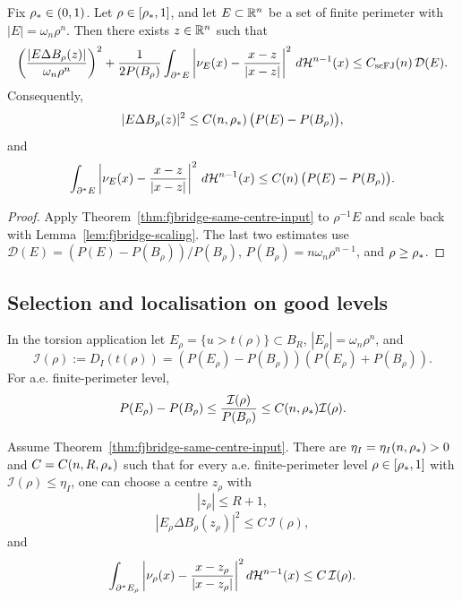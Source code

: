 \begin{corollary}
\label{cor:fjbridge-scaled}
Fix \(\rho_*\in(0,1)\).  Let \(\rho\in[\rho_*,1]\), and let
\(E\subset\mathbb{R}^n\) be a set of finite perimeter with
\(|E|=\omega_n\rho^n\).  Then there exists \(z\in\mathbb{R}^n\) such that
\[
   \left(\frac{|E\Delta B_\rho(z)|}{\omega_n\rho^n}\right)^2
   +\frac{1}{2P(B_\rho)}
      \int_{\partial^*E}
      \left|\nu_E(x)-\frac{x-z}{|x-z|}\right|^2\,d\mathcal H^{n-1}(x)
   \le C_{\rm scFJ}(n)\,\mathcal D(E).
\]
Consequently,
\[
   |E\Delta B_\rho(z)|^2
      \le C(n,\rho_*)\,
         \bigl(P(E)-P(B_\rho)\bigr),
\]
and
\[
   \int_{\partial^*E}
      \left|\nu_E(x)-\frac{x-z}{|x-z|}\right|^2\,d\mathcal H^{n-1}(x)
      \le C(n)\,\bigl(P(E)-P(B_\rho)\bigr).
\]
\end{corollary}

\begin{proof}
Apply Theorem~\ref{thm:fjbridge-same-centre-input} to
\(\rho^{-1}E\) and scale back with Lemma~\ref{lem:fjbridge-scaling}.
The last two estimates use
\(\mathcal D(E)=(P(E)-P(B_\rho))/P(B_\rho)\),
\(P(B_\rho)=n\omega_n\rho^{n-1}\), and \(\rho\ge\rho_*\).
\end{proof}

\subsection{Selection and localisation on good levels}
\label{ssec:fjbridge-selection}

In the torsion application let \(E_\rho=\{u>t(\rho)\}\subset B_R\),
\(|E_\rho|=\omega_n\rho^n\), and
\[
   \mathcal I(\rho):=D_I(t(\rho))
   =(P(E_\rho)-P(B_\rho))(P(E_\rho)+P(B_\rho)).
\]
For a.e. finite-perimeter level,
\[
   P(E_\rho)-P(B_\rho)
   \le \frac{\mathcal I(\rho)}{P(B_\rho)}
   \le C(n,\rho_*)\mathcal I(\rho).
\]

\begin{proposition}
\label{prop:fjbridge-good-level}
Assume Theorem~\ref{thm:fjbridge-same-centre-input}.  There are
\(\eta_I=\eta_I(n,\rho_*)>0\) and \(C=C(n,R,\rho_*)\) such that for
every a.e. finite-perimeter level \(\rho\in[\rho_*,1]\) with
\(\mathcal I(\rho)\le\eta_I\), one can choose a centre \(z_\rho\)
with
\[
   |z_\rho|\le R+1,
\]
\[
   |E_\rho\Delta B_\rho(z_\rho)|^2
      \le C\,\mathcal I(\rho),
\]
and
\[
   \int_{\partial^*E_\rho}
      \left|\nu_\rho(x)-\frac{x-z_\rho}{|x-z_\rho|}\right|^2
      d\mathcal H^{n-1}(x)
      \le C\,\mathcal I(\rho).
\]
\end{proposition}

